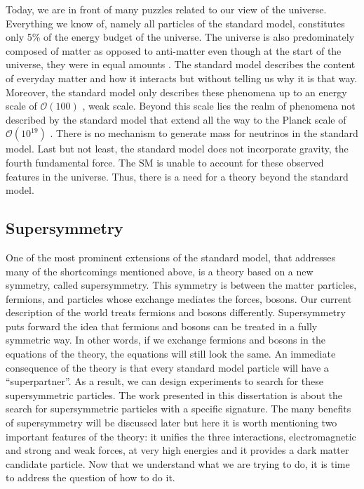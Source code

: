 Today, we are in front of many puzzles related to our view of the universe.
Everything we know of, namely all particles of the standard model, 
constitutes only 5\% of the energy budget of the universe. 
The universe is also predominately composed of matter as opposed to 
anti-matter even though at the start of the universe, they were in equal 
amounts%
. The standard model describes the content of 
everyday matter 
and how it interacts but without telling us why it is that way.
Moreover, the standard model only describes these phenomena 
up to an energy scale of $\mathcal{O}\left(100\right)$ \GeV, weak scale.
Beyond this scale lies the realm of phenomena not described by the standard 
model that extend all the way to the Planck scale of 
$\mathcal{O}\left(10^{19}\right)$ \GeV.%
There is no mechanism to generate mass for 
neutrinos in the standard model. Last but not least, the standard model 
does not incorporate gravity, the fourth fundamental force.
The SM is unable to account for these observed 
features in the universe. 
Thus, there is a need for a theory beyond the standard model.

\subsection*{Supersymmetry}

One of the most prominent extensions of the standard model, 
that addresses many of the shortcomings mentioned above, is a theory based on 
a new symmetry, called supersymmetry.
This symmetry is between the matter particles, fermions, and particles whose
exchange mediates the forces, bosons. Our current description of the world
treats fermions and bosons differently. Supersymmetry puts forward the idea
that fermions and bosons can be treated in a fully symmetric way. 
In other words,
if we exchange fermions and bosons in the equations of the theory, the 
equations will still look the same. An immediate consequence of the theory
is that every standard model particle will have a ``superpartner''.
As a result, we can design experiments to search for these 
supersymmetric particles. The work presented in this dissertation is about the search for supersymmetric particles with a specific signature.
The many benefits of supersymmetry will be discussed later but here it is worth 
mentioning two important features of the theory: 
it unifies the three interactions, electromagnetic and strong and weak forces,
at very high energies 
and it provides a dark matter candidate particle. 
Now that we understand what we are trying to do, it is time to address 
the question of how to do it.

